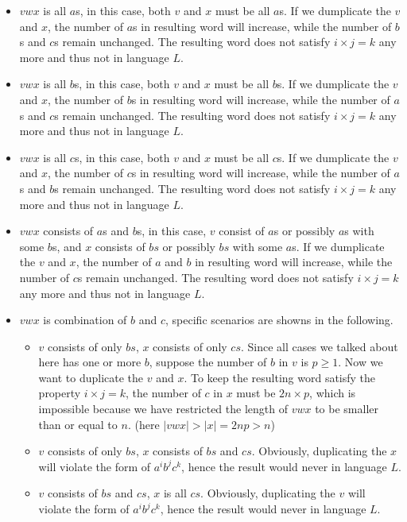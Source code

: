 \documentclass[11pt,a4paper]{article}
\begin{document}
\begin{itemize} \renewcommand{\labelitemii}{$\diamond$}
    \item{$vwx$ is all $a$s, in this case, both $v$ and $x$ must be all $a$s. If we dumplicate the $v$ and $x$, the number of $a$s in resulting word will increase, while the number of $b$s and $c$s remain unchanged. The resulting word does not satisfy $i \times j = k $ any more and thus not in language $L$.}
    \item{$vwx$ is all $b$s, in this case, both $v$ and $x$ must be all $b$s. If we dumplicate the $v$ and $x$, the number of $b$s in resulting word will increase, while the number of $a$s and $c$s remain unchanged. The resulting word does not satisfy $i \times j = k $ any more and thus not in language $L$.}
    \item{$vwx$ is all $c$s, in this case, both $v$ and $x$ must be all $c$s. If we dumplicate the $v$ and $x$, the number of $c$s in resulting word will increase, while the number of $a$s and $b$s remain unchanged. The resulting word does not satisfy $i \times j = k $ any more and thus not in language $L$.}
    \item{$vwx$ consists of $a$s and $b$s, in this case, $v$ consist of $a$s or possibly $a$s with some $b$s, and $x$ consists of $bs$ or possibly $bs$ with some $a$s. If we dumplicate the $v$ and $x$, the number of $a$ and $b$ in resulting word will increase, while the number of $c$s remain unchanged. The resulting word does not satisfy $i \times j = k $ any more and thus not in language $L$.}
    \item{$vwx$ is combination of $b$ and $c$, specific scenarios are showns in the following. }
     \begin{itemize}
         \item{$v$ consists of only $bs$, $x$ consists of only $cs$. Since all cases we talked about here has one or more $b$, suppose the number of $b$ in $v$ is $p\geq 1$. Now we want to duplicate the $v$ and $x$. To keep the resulting word satisfy the property $i \times j = k $, the number of $c$ in $x$ must be $2n\times p$, which is impossible because we have restricted the length of $vwx$ to be smaller than or equal to $n$. (here $|vwx| > |x| = 2np > n$)}
         \item{$v$ consists of only $bs$, $x$ consists of $bs$ and $cs$. Obviously, duplicating the $x$ will violate the form of $a^{i} b^{j} c^{k}$, hence the result would never in language $L$. }
        \item{$v$ consists of $bs$ and $cs$, $x$ is all $cs$. Obviously, duplicating the $v$ will violate the form of $a^{i} b^{j} c^{k}$, hence the result would never in language $L$.}
     \end{itemize}
\end{itemize}
\end{document}
